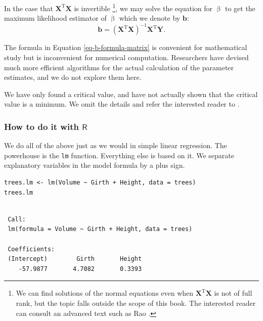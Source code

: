 \documentclass[captions=tableheading]{scrbook}
\begin{document}
In the case that \(\mathbf{X}^{\mathrm{T}}\mathbf{X}\) is invertible
\footnote{We can find solutions of the normal equations even when \(\mathbf{X}^{\mathrm{T}}\mathbf{X}\) is not of full rank, but the topic falls outside the scope of this book. The interested reader can consult an advanced text such as Rao \cite{Rao1999}.},
we may solve the equation for \(\upbeta\) to get the maximum likelihood estimator of \(\upbeta\) which we denote by \(\mathbf{b}\):
\begin{equation}
\mathbf{b}=\left(\mathbf{X}^{\mathrm{T}}\mathbf{X}\right)^{-1}\mathbf{X}^{\mathrm{T}}\mathbf{Y}.\label{eq-b-formula-matrix}
\end{equation}

\begin{rem}
The formula in Equation \ref{eq-b-formula-matrix} is convenient for mathematical study but is inconvenient for numerical computation. Researchers have devised much more efficient algorithms for the actual calculation of the parameter estimates, and we do not explore them here.
\end{rem}

\begin{rem}
We have only found a critical value, and have not actually shown that the critical value is a minimum. We omit the details and refer the interested reader to \cite{Rao1999}.
\end{rem}
\subsubsection{How to do it with \(\mathsf{R}\)}
\label{sec-12-2-1-1}


We do all of the above just as we would in simple linear regression. The powerhouse is the \texttt{lm} function. Everything else is based on it. We separate explanatory variables in the model formula by a plus sign.


\lstset{language=R}
\begin{lstlisting}
trees.lm <- lm(Volume ~ Girth + Height, data = trees)
trees.lm
\end{lstlisting}

\begin{verbatim}
 
 Call:
 lm(formula = Volume ~ Girth + Height, data = trees)
 
 Coefficients:
 (Intercept)        Girth       Height  
    -57.9877       4.7082       0.3393
\end{verbatim}
\end{document}
